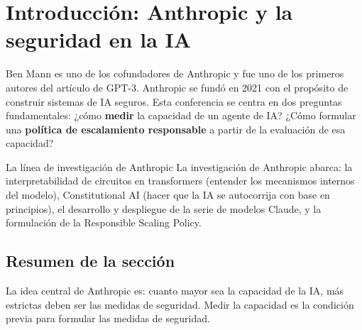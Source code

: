 \section{Introducción: Anthropic y la seguridad en la IA}

Ben Mann es uno de los cofundadores de Anthropic y fue uno de los primeros autores del artículo de GPT-3. Anthropic se fundó en 2021 con el propósito de construir sistemas de IA seguros. Esta conferencia se centra en dos preguntas fundamentales: ¿cómo \textbf{medir} la capacidad de un agente de IA? ¿Cómo formular una \textbf{política de escalamiento responsable} a partir de la evaluación de esa capacidad?

\begin{knowledgebox}{La línea de investigación de Anthropic}
La investigación de Anthropic abarca: la interpretabilidad de circuitos en transformers (entender los mecanismos internos del modelo), Constitutional AI (hacer que la IA se autocorrija con base en principios), el desarrollo y despliegue de la serie de modelos Claude, y la formulación de la Responsible Scaling Policy.
\end{knowledgebox}

\subsection{Resumen de la sección}

La idea central de Anthropic es: cuanto mayor sea la capacidad de la IA, más estrictas deben ser las medidas de seguridad. Medir la capacidad es la condición previa para formular las medidas de seguridad.

